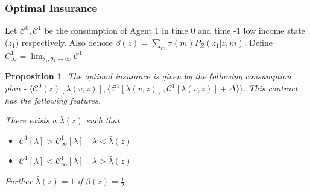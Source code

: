 \documentclass{beamer}
\newtheorem{proposition}{Proposition}
\begin{document}
\begin{frame}
\frametitle{Optimal Insurance}
Let $\mathcal{C}^0,\mathcal{C}^1$ be the consumption of Agent 1 in time 0 and time -1 low income state ($z_1$) respectively. Also denote $\beta(z)=\sum_{m}{\pi(m)P_Z(z_1|z,m)}$. Define $C^1_{\infty} = \lim_{\theta_1,\theta_2 \to \infty} \mathcal{C}^1$
\begin{proposition}
The optimal insurance is given by the following consumption plan  - $\langle \mathcal{C}^0(z)[\lambda(v,z)],\{\mathcal{C}^{1}[\lambda(v,z)],\mathcal{C}^{1}[\lambda(v,z)]+\Delta\}\rangle$. This contract has the following features.

There exists a $\bar{\lambda}(z)$ such that 
\begin{itemize}
	\item $\mathcal{C}^{1}[\lambda] > \mathcal{C}^{1}_{\infty}[\lambda] \quad \lambda < \bar{\lambda}(z)$
	\item $\mathcal{C}^{1}[\lambda] < \mathcal{C}^{1}_{\infty}[\lambda] \quad \lambda > \bar{\lambda}(z)$
\end{itemize}

Further $\bar{\lambda}(z)=1$ if $\beta(z)=\frac{1}{2}$
\end{proposition}


\end{frame}
\end{document}
